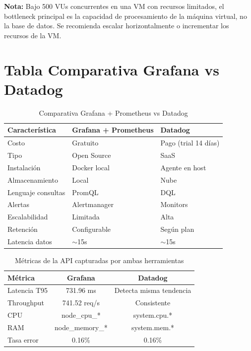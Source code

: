 \documentclass[12pt, a4paper]{article}
\begin{document}
\textbf{Nota:} Bajo 500 VUs concurrentes en una VM con recursos limitados, el bottleneck principal es la capacidad de procesamiento de la máquina virtual, no la base de datos. Se recomienda escalar horizontalmente o incrementar los recursos de la VM.

\newpage

\section{Tabla Comparativa Grafana vs Datadog}

\begin{table}[H]
\centering
\caption{Comparativa Grafana + Prometheus vs Datadog}
\label{tab:comparativa}
\begin{tabular}{lll}
\toprule
\textbf{Característica} & \textbf{Grafana + Prometheus} & \textbf{Datadog} \\
\midrule
Costo & Gratuito & Pago (trial 14 días) \\
Tipo & Open Source & SaaS \\
Instalación & Docker local & Agente en host \\
Almacenamiento & Local & Nube \\
Lenguaje consultas & PromQL & DQL \\
Alertas & Alertmanager & Monitors \\
Escalabilidad & Limitada & Alta \\
Retención & Configurable & Según plan \\
Latencia datos & $\sim$15s & $\sim$15s \\
\bottomrule
\end{tabular}
\end{table}

\begin{table}[H]
\centering
\caption{Métricas de la API capturadas por ambas herramientas}
\label{tab:metricas}
\begin{tabular}{lcc}
\toprule
\textbf{Métrica} & \textbf{Grafana} & \textbf{Datadog} \\
\midrule
Latencia T95 & 731.96 ms & Detecta misma tendencia \\
Throughput & 741.52 req/s & Consistente \\
CPU & node\_cpu\_* & system.cpu.* \\
RAM & node\_memory\_* & system.mem.* \\
Tasa error & 0.16\% & 0.16\% \\
\bottomrule
\end{tabular}
\end{table}
\end{document}

